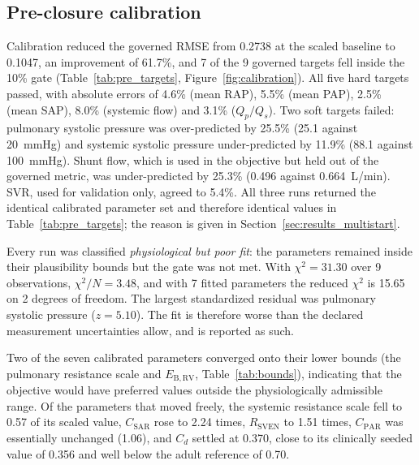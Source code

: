 \subsection{Pre-closure calibration}
\label{sec:results_pre}
Calibration reduced the governed RMSE from 0.2738 at the scaled baseline to 0.1047, an improvement of 61.7\%, and 7 of the 9 governed targets fell inside the 10\% gate (Table~\ref{tab:pre_targets}, Figure~\ref{fig:calibration}). All five hard targets passed, with absolute errors of 4.6\% (mean RAP), 5.5\% (mean PAP), 2.5\% (mean SAP), 8.0\% (systemic flow) and 3.1\% ($Q_p/Q_s$). Two soft targets failed: pulmonary systolic pressure was over-predicted by 25.5\% (25.1 against 20~mmHg) and systemic systolic pressure under-predicted by 11.9\% (88.1 against 100~mmHg). Shunt flow, which is used in the objective but held out of the governed metric, was under-predicted by 25.3\% (0.496 against 0.664~L/min). SVR, used for validation only, agreed to 5.4\%. All three runs returned the identical calibrated parameter set and therefore identical values in Table~\ref{tab:pre_targets}; the reason is given in Section~\ref{sec:results_multistart}.

Every run was classified \emph{physiological but poor fit}: the parameters remained inside their plausibility bounds but the gate was not met. With $\chi^2 = 31.30$ over 9 observations, $\chi^2/N = 3.48$, and with 7 fitted parameters the reduced $\chi^2$ is 15.65 on 2 degrees of freedom. The largest standardized residual was pulmonary systolic pressure ($z = 5.10$). The fit is therefore worse than the declared measurement uncertainties allow, and is reported as such.

Two of the seven calibrated parameters converged onto their lower bounds (the pulmonary resistance scale and $E_{\mathrm{B,RV}}$, Table~\ref{tab:bounds}), indicating that the objective would have preferred values outside the physiologically admissible range. Of the parameters that moved freely, the systemic resistance scale fell to 0.57 of its scaled value, $C_{\mathrm{SAR}}$ rose to 2.24 times, $R_{\mathrm{SVEN}}$ to 1.51 times, $C_{\mathrm{PAR}}$ was essentially unchanged (1.06), and $C_d$ settled at 0.370, close to its clinically seeded value of 0.356 and well below the adult reference of 0.70.

